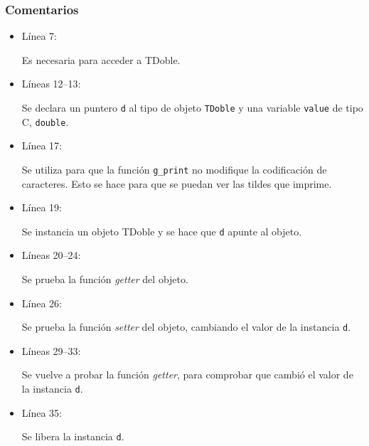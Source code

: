 \subsubsection{Comentarios}
\begin{itemize}
\item Línea 7:\par
  Es necesaria para acceder a \textsf{TDoble}.
\item Líneas 12--13:\par
  Se declara un puntero \texttt{d} al tipo de objeto \texttt{TDoble} y una variable \texttt{value} de tipo C,
  \texttt{double}.
\item Línea 17:\par
  Se utiliza para que la función \texttt{g\_print} no modifique la codificación de caracteres. Esto se hace
  para que se puedan ver las tildes que imprime.
\item Línea 19:\par
  Se instancia un objeto \textsf{TDoble} y se hace que \texttt{d} apunte al objeto.
\item Líneas 20--24:\par
  Se prueba la función \textit{getter} del objeto.
\item Línea 26:\par
  Se prueba la función \textit{setter} del objeto, cambiando el valor de la instancia \texttt{d}.
\item Líneas 29--33:\par
  Se vuelve a probar la función \textit{getter}, para comprobar que cambió el valor de la instancia \texttt{d}.
\item Línea 35:\par
  Se libera la instancia \texttt{d}.
\end{itemize}





